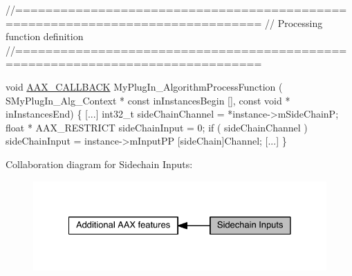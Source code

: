 \begin{DoxyCode}
\textcolor{comment}{//==============================================================================}
\textcolor{comment}{// Processing function definition}
\textcolor{comment}{//==============================================================================}

\textcolor{keywordtype}{void}
\hyperlink{a00149_aaa22112139aa627574b1ef562f579d43}{AAX\_CALLBACK}
MyPlugIn\_AlgorithmProcessFunction (
    SMyPlugIn\_Alg\_Context * \textcolor{keyword}{const}   inInstancesBegin [],
    \textcolor{keyword}{const} \textcolor{keywordtype}{void} *                    inInstancesEnd)
\{
    [...]
    int32\_t sideChainChannel = *instance->mSideChainP;   
    \textcolor{keywordtype}{float} * AAX\_RESTRICT sideChainInput = 0;
    \textcolor{keywordflow}{if} ( sideChainChannel )
      sideChainInput = instance->mInputPP [sideChain]Channel;
    [...]
\}
\end{DoxyCode}
 Collaboration diagram for Sidechain Inputs\+:
\nopagebreak
\begin{figure}[H]
\begin{center}
\leavevmode
\includegraphics[width=328pt]{a00338}
\end{center}
\end{figure}
